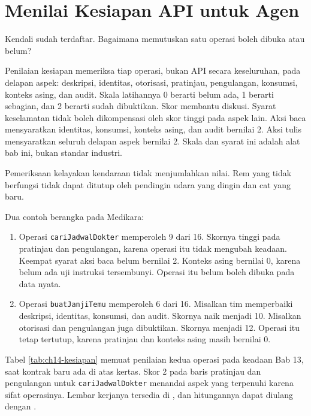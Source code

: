 \section{Menilai Kesiapan API untuk Agen}

Kendali sudah terdaftar. Bagaimana memutuskan satu operasi boleh dibuka atau belum?

Penilaian kesiapan memeriksa tiap operasi, bukan API secara keseluruhan, pada delapan aspek: deskripsi, identitas, otorisasi, pratinjau, pengulangan, konsumsi, konteks asing, dan audit. Skala latihannya 0 berarti belum ada, 1 berarti sebagian, dan
2 berarti sudah dibuktikan. Skor membantu diskusi. Syarat keselamatan tidak boleh dikompensasi oleh skor tinggi pada aspek lain. Aksi baca mensyaratkan identitas, konsumsi, konteks asing, dan audit bernilai 2. Aksi tulis mensyaratkan seluruh delapan aspek
bernilai 2. Skala dan syarat ini adalah alat bab ini, bukan standar industri.

Pemeriksaan kelayakan kendaraan tidak menjumlahkan nilai. Rem yang tidak berfungsi tidak dapat ditutup oleh pendingin udara yang dingin dan cat yang baru.

Dua contoh berangka pada Medikara:
\begin{enumerate}
  \item Operasi \texttt{cariJadwalDokter} memperoleh 9 dari 16. Skornya tinggi pada pratinjau dan pengulangan, karena operasi itu tidak mengubah keadaan. Keempat syarat aksi baca belum bernilai 2. Konteks asing bernilai 0, karena belum ada uji instruksi
        tersembunyi. Operasi itu belum boleh dibuka pada data nyata.
  \item Operasi \texttt{buatJanjiTemu} memperoleh 6 dari 16. Misalkan tim memperbaiki deskripsi, identitas, konsumsi, dan audit. Skornya naik menjadi 10. Misalkan otorisasi dan pengulangan juga dibuktikan. Skornya menjadi 12. Operasi itu tetap tertutup,
        karena pratinjau dan konteks asing masih bernilai 0.
\end{enumerate}

Tabel \ref{tab:ch14-kesiapan} memuat penilaian kedua operasi pada keadaan Bab 13, saat kontrak baru ada di atas kertas. Skor 2 pada baris pratinjau dan pengulangan untuk \texttt{cariJadwalDokter} menandai aspek yang terpenuhi karena sifat operasinya. Lembar kerjanya
tersedia di , dan hitungannya dapat diulang dengan .

